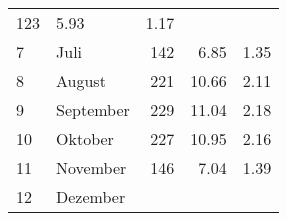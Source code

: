 \begin{longtable}{lXrrr}
       \num{123} &
       \num[round-mode=places,round-precision=2]{5,93} &
         \num[round-mode=places,round-precision=2]{1,17} \\

     7 &
     \multicolumn{1}{X}{ Juli   } &


       \num{142} &
       \num[round-mode=places,round-precision=2]{6,85} &
         \num[round-mode=places,round-precision=2]{1,35} \\

     8 &
     \multicolumn{1}{X}{ August   } &


       \num{221} &
       \num[round-mode=places,round-precision=2]{10,66} &
         \num[round-mode=places,round-precision=2]{2,11} \\

     9 &
     \multicolumn{1}{X}{ September   } &


       \num{229} &
       \num[round-mode=places,round-precision=2]{11,04} &
         \num[round-mode=places,round-precision=2]{2,18} \\

     10 &
     \multicolumn{1}{X}{ Oktober   } &


       \num{227} &
       \num[round-mode=places,round-precision=2]{10,95} &
         \num[round-mode=places,round-precision=2]{2,16} \\

     11 &
     \multicolumn{1}{X}{ November   } &


       \num{146} &
       \num[round-mode=places,round-precision=2]{7,04} &
         \num[round-mode=places,round-precision=2]{1,39} \\

     12 &
     \multicolumn{1}{X}{ Dezember   } &



\end{longtable}
